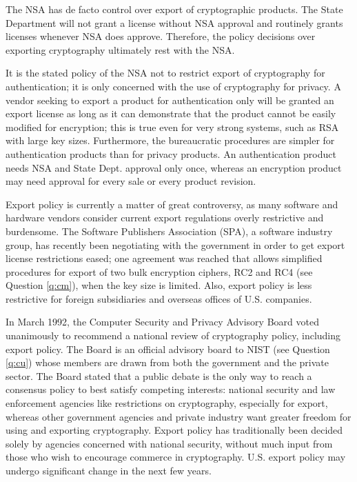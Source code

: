The NSA has de facto control over export of cryptographic products. The State 
Department will not grant a license without NSA approval and routinely grants 
licenses whenever NSA does approve. Therefore, the policy decisions over 
exporting cryptography ultimately rest with the NSA.

It is the stated policy of the NSA not to restrict export of cryptography
for authentication; it is only concerned with the use of cryptography for 
privacy. A vendor seeking to export a product for authentication only will 
be granted an export license as long as it can demonstrate that the product 
cannot be easily modified for encryption; this is true even for very strong 
systems, such as RSA with large key sizes. Furthermore, the bureaucratic 
procedures are simpler for authentication products than for privacy products. 
An authentication product needs NSA and State Dept. approval only once, 
whereas an encryption product may need approval for every sale or every 
product revision.

Export policy is currently a matter of great controversy, as many software
and hardware vendors consider current export regulations overly restrictive 
and burdensome. The Software Publishers Association (SPA), a software 
industry group, has recently been negotiating with the government in order 
to get export license restrictions eased; one agreement was reached that 
allows simplified procedures for export of two bulk encryption ciphers, RC2 
and RC4 (see Question \ref{q:cm}), when the key size is limited. Also, export 
policy is less restrictive for foreign subsidiaries and overseas offices of 
U.S. companies.

In March 1992, the Computer Security and Privacy Advisory Board voted 
unanimously to recommend a national review of cryptography policy, 
including export policy. The Board is an official advisory board to NIST 
(see Question \ref{q:cu}) whose members are drawn from both the government 
and the private sector. The Board stated that a public debate is the only 
way to reach a consensus policy to best satisfy competing interests: 
national security and law enforcement agencies like restrictions on 
cryptography, especially for export, whereas other government agencies and 
private industry want greater freedom for using and exporting cryptography. 
Export policy has traditionally been decided solely by agencies concerned 
with national security, without much input from those who wish to encourage 
commerce in cryptography. U.S. export policy may undergo significant change 
in the next few years.

